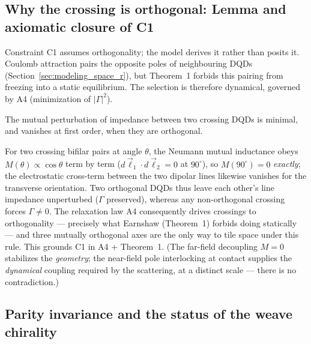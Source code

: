 \documentclass[11pt,a4paper]{article}
\theoremstyle{plain}
\theoremstyle{remark}
\begin{document}
\subsection{Why the crossing is orthogonal: Lemma and axiomatic closure of C1}
\label{maxwell3d:orthogonality}

Constraint C1 assumes orthogonality; the model derives it rather than posits it. Coulomb attraction pairs the opposite poles of neighbouring DQDs (Section~\ref{sec:modeling_space_r}), but Theorem~1 forbids this pairing from freezing into a static equilibrium. The selection is therefore dynamical, governed by A4 (minimization of $|\Gamma|^2$).

\begin{description}[leftmargin=0pt]
\item[Lemma (Orthogonal decoupling).] The mutual perturbation of impedance between two crossing DQDs is minimal, and vanishes at first order, when they are orthogonal.
\end{description}

\noindent For two crossing bifilar pairs at angle $\theta$, the Neumann mutual inductance obeys $M(\theta)\propto\cos\theta$ term by term ($d\vec\ell_1\!\cdot\!d\vec\ell_2 = 0$ at $90^\circ$), so $M(90^\circ)=0$ \emph{exactly}; the electrostatic cross-term between the two dipolar lines likewise vanishes for the transverse orientation. Two orthogonal DQDs thus leave each other's line impedance unperturbed ($\Gamma$ preserved), whereas any non-orthogonal crossing forces $\Gamma\neq0$. The relaxation law A4 consequently drives crossings to orthogonality --- precisely what Earnshaw (Theorem~1) forbids doing statically --- and three mutually orthogonal axes are the only way to tile space under this rule. This grounds C1 in A4 + Theorem~1. (The far-field decoupling $M=0$ stabilizes the \emph{geometry}; the near-field pole interlocking at contact supplies the \emph{dynamical} coupling required by the scattering, at a distinct scale --- there is no contradiction.)

\subsection{Parity invariance and the status of the weave chirality}
\label{maxwell3d:chirality}
\end{document}
